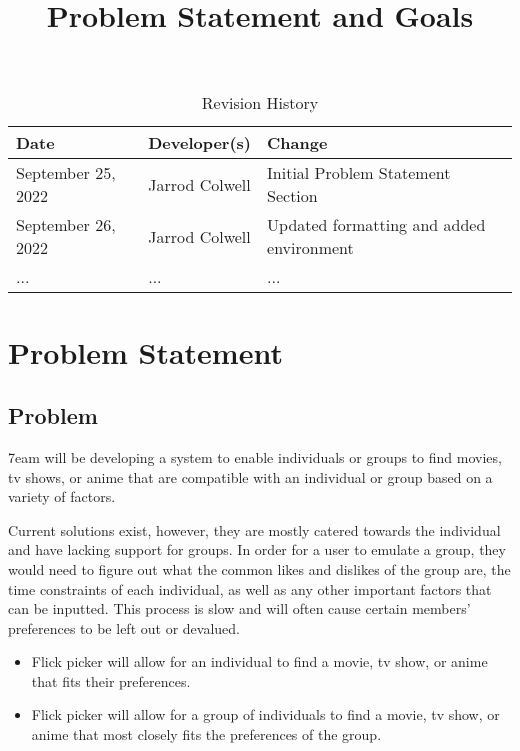 \documentclass{article}
\title{Problem Statement and Goals\\\progname}
\author{\authname}
\date{}
\begin{document}
\maketitle

\begin{table}[hp]
\caption{Revision History} \label{TblRevisionHistory}
\begin{tabularx}{\textwidth}{llX}
\toprule
\textbf{Date} & \textbf{Developer(s)} & \textbf{Change}\\
\midrule
September 25, 2022 & Jarrod Colwell & Initial Problem Statement Section\\
September 26, 2022 & Jarrod Colwell & Updated formatting and added environment\\
... & ... & ...\\
\bottomrule
\end{tabularx}
\end{table}

\section{Problem Statement}

\subsection{Problem}

\hspace*{\parindent}7eam will be developing a system to enable individuals or groups to find movies, tv shows, or anime that are compatible with an individual or group based on a variety of factors.\newline


Current solutions exist, however, they are mostly catered towards the individual and have lacking support for groups. In order for a user to emulate a group, they would need to figure out what the common likes and dislikes of the group are, the time constraints of each individual, as well as any other important factors that can be inputted. This process is slow and will often cause certain members' preferences to be left out or devalued. 

\begin{itemize}
	\item Flick picker will allow for an individual to find a movie, tv show, or anime that fits their preferences.	
	\item Flick picker will allow for a group of individuals to find a movie, tv show, or anime that most closely fits the preferences of the group.
\end{itemize}
\end{document}
